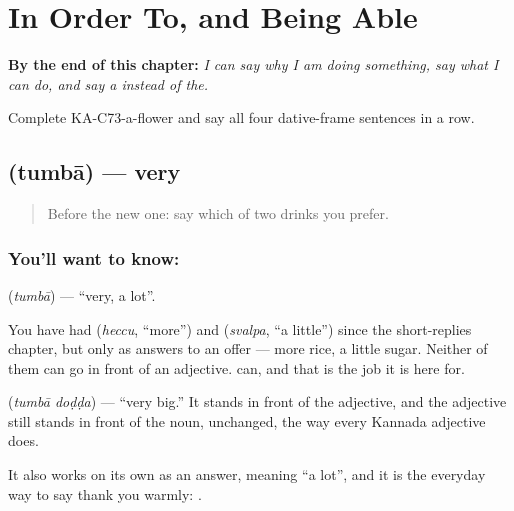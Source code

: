 
\chapter{In Order To, and Being Able}
\label{ch:ka-in-order-to}

\begin{chapteropening}
\textbf{By the end of this chapter:} \emph{I can say why I am doing something, say what I can do, and say a instead of the.}

Complete KA-C73-a-flower and say all four dative-frame sentences in a row.
\end{chapteropening}

\section[\texorpdfstring{\kn{ತುಂಬಾ} (tumbā)}{ತುಂಬಾ (tumbā)}]{ (tumbā) — very}

\label{lesson:KA-C73-very}



\begin{quote}
Before the new one: say which of two drinks you prefer.
\end{quote}

\subsection*{You'll want to know: }
\textbf{} (\emph{tumbā}) — \textquotedblleft{}very, a lot\textquotedblright{}.

You have had  (\emph{heccu}, \textquotedblleft{}more\textquotedblright{}) and  (\emph{svalpa}, \textquotedblleft{}a little\textquotedblright{}) since the short-replies chapter, but only as answers to an offer — more rice, a little sugar. Neither of them can go in front of an adjective.  can, and that is the job it is here for.

\textbf{ } (\emph{tumbā doḍḍa}) — \textquotedblleft{}very big.\textquotedblright{} It stands in front of the adjective, and the adjective still stands in front of the noun, unchanged, the way every Kannada adjective does.

It also works on its own as an answer, meaning \textquotedblleft{}a lot\textquotedblright{}, and it is the everyday way to say thank you warmly:  .

